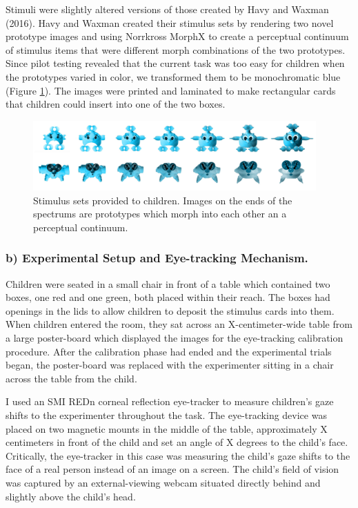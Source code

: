 \documentclass[floatsintext,man]{apa6}
\theoremstyle{definition}
\theoremstyle{definition}
\theoremstyle{definition}
\theoremstyle{remark}
\begin{document}
Stimuli were slightly altered versions of those created by Havy and
Waxman (2016). Havy and Waxman created their stimulus sets by rendering
two novel prototype images and using Norrkross MorphX to create a
perceptual continuum of stimulus items that were different morph
combinations of the two prototypes. Since pilot testing revealed that
the current task was too easy for children when the prototypes varied in
color, we transformed them to be monochromatic blue (Figure
\ref{fig:stimuli}). The images were printed and laminated to make
rectangular cards that children could insert into one of the two boxes.

\begin{figure}

{\centering \includegraphics[width=4.27in]{../images/stimuli} 

}

\caption{Stimulus sets provided to children. Images on the ends of the spectrums are prototypes which morph into each other an a perceptual continuum.}\label{fig:stimuli}
\end{figure}

\subsubsection{b) Experimental Setup and Eye-tracking
Mechanism.}\label{b-experimental-setup-and-eye-tracking-mechanism.}

Children were seated in a small chair in front of a table which
contained two boxes, one red and one green, both placed within their
reach. The boxes had openings in the lids to allow children to deposit
the stimulus cards into them. When children entered the room, they sat
across an X-centimeter-wide table from a large poster-board which
displayed the images for the eye-tracking calibration procedure. After
the calibration phase had ended and the experimental trials began, the
poster-board was replaced with the experimenter sitting in a chair
across the table from the child.

I used an SMI REDn corneal reflection eye-tracker to measure children's
gaze shifts to the experimenter throughout the task. The eye-tracking
device was placed on two magnetic mounts in the middle of the table,
approximately X centimeters in front of the child and set an angle of X
degrees to the child's face. Critically, the eye-tracker in this case
was measuring the child's gaze shifts to the face of a real person
instead of an image on a screen. The child's field of vision was
captured by an external-viewing webcam situated directly behind and
slightly above the child's head.
\end{document}
